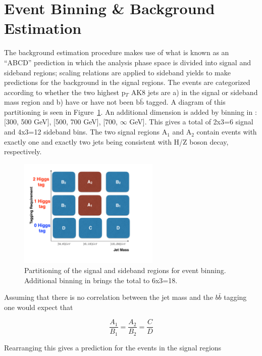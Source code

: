 \section{Event Binning \& Background Estimation}

The background estimation procedure makes use of what is known as an ``ABCD'' prediction in which the analysis phase space is divided into signal and sideband regions; scaling relations are applied to sideband yields to make predictions for the background in the signal regions. The events are categorized according to whether the two highest p$_{T}$ AK8 jets are a) in the signal or sideband mass region and b) have or have not been $\mathrm{b}\bar{\mathrm{b}}$ tagged.  A diagram of this partitioning is seen in Figure~\ref{fig:abcd}. An additional dimension is added by binning in \ptmiss: [300, 500 GeV], [500, 700 GeV], [700, $\infty$ GeV]. This gives a total of 2x3=6 signal and 4x3=12 sideband bins. The two signal regions A$_{1}$ and A$_{2}$ contain events with exactly one and exactly two jets being consistent with H/Z boson decay, respectively.

\begin{figure}[hbp!]
\centering
\includegraphics[width=0.6\textwidth]{figs/CMS-SUS-17-006_Figure-aux_002.pdf}
\caption[Partitioning of the signal and sideband regions for event binning.]{Partitioning of the signal and sideband regions for event binning. Additional binning in \ptmiss brings the total to 6x3=18.}
\label{fig:abcd}
\end{figure}

Assuming that there is no correlation between the jet mass and the $b\bar{b}$ tagging one would expect that

\begin{equation}
\frac{A_{1}}{B_{1}} = \frac{A_{2}}{B_{2}} = \frac{C}{D}
\end{equation}

Rearranging this gives a prediction for the events in the signal regions

